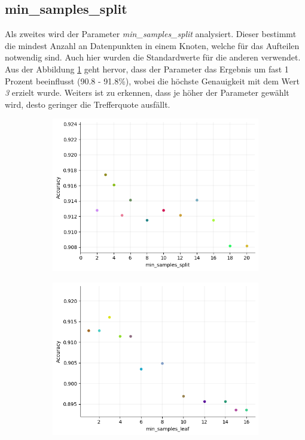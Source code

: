 \subsection{min\_samples\_split}

Als zweites wird der Parameter \textit{min\_samples\_split} analysiert. Dieser bestimmt die mindest Anzahl an Datenpunkten in einem Knoten, welche für das Aufteilen notwendig sind. Auch hier wurden die Standardwerte für die anderen verwendet. Aus der Abbildung \ref{fig:rf_min_samples_split} geht hervor, dass der Parameter das Ergebnis um fast 1 Prozent beeinflusst (90.8 - 91.8\%), wobei die höchste Genauigkeit mit dem Wert \textit{3} erzielt wurde. Weiters ist zu erkennen, dass je höher der Parameter gewählt wird, desto geringer die Trefferquote ausfällt.

\begin{figure}
  \centering
  \begin{subfigure}[c]{0.45\textwidth}
    \centering
    \includegraphics[width=\textwidth]{images/min_samples_split.png}
    \label{fig:rf_min_samples_split}
  \end{subfigure}
  \hfill
  \begin{subfigure}[c]{0.45\textwidth}
    \centering
    \includegraphics[width=\textwidth]{images/min_samples_leaf.png}

\end{subfigure}
\end{figure}
